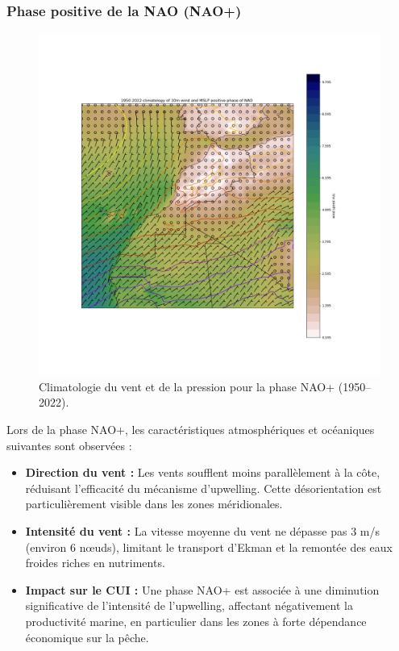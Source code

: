 \subsubsection*{Phase positive de la NAO (NAO+)}
\begin{figure}[H]
\centering
\includegraphics[scale=0.3]{POS_PHASE.png}
\caption{Climatologie du vent et de la pression pour la phase NAO+ (1950–2022).}
\label{fig:nao_positive}
\end{figure}

Lors de la phase NAO+, les caractéristiques atmosphériques et océaniques suivantes sont observées :
\begin{itemize}
    \item \textbf{Direction du vent :} Les vents soufflent moins parallèlement à la côte, réduisant l'efficacité du mécanisme d'upwelling. Cette désorientation est particulièrement visible dans les zones méridionales.
    \item \textbf{Intensité du vent :} La vitesse moyenne du vent ne dépasse pas 3 m/s (environ 6 nœuds), limitant le transport d'Ekman et la remontée des eaux froides riches en nutriments.
    \item \textbf{Impact sur le CUI :} Une phase NAO+ est associée à une diminution significative de l’intensité de l’upwelling, affectant négativement la productivité marine, en particulier dans les zones à forte dépendance économique sur la pêche.
\end{itemize}

